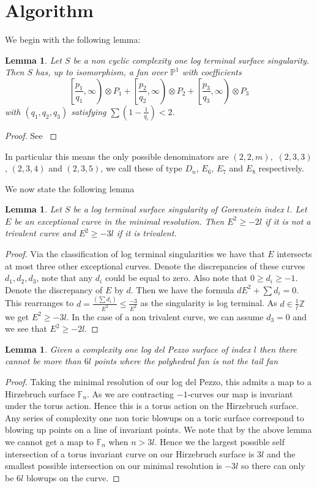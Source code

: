 \documentclass[12pt,a4paper]{book}      %
\newtheorem{lem}[thm]{Lemma}
\theoremstyle{definition}
\begin{document}
\section{Algorithm}
We begin with the following lemma:
\begin{lem}{\cite{Suss}}
Let $S$ be a non cyclic complexity one log terminal surface singularity. Then $S$ has, up to isomorphism, a fan over $\mathbb{P}^1$ with coefficients
\[
\left[\frac{p_1}{q_1}, \infty \right) \otimes P_1 + \left[ \frac{p_2}{q_2}, \infty \right) \otimes P_2 + \left[ \frac{p_3}{q_3}, \infty \right) \otimes P_3
\]
with $(q_1, q_2, q_3)$ satisfying $\sum(1 - \frac{1}{q_i}) < 2$.
\end{lem}
\begin{proof}
See \cite{Suss}
\end{proof}
In particular this means the only possible denominators are $(2,2,m),$ $(2,3,3)$, $(2,3,4)$ and $(2,3,5)$, we call these of type $D_n$, $E_6$, $E_7$ and $E_8$ respectively. 

We now state the following  lemma
\begin{lem}{\label{trivalent}}
Let $S$ be a log terminal surface singularity of Gorenstein index $l$. Let $E$ be an exceptional curve in the minimal resolution. Then $E^2 \geq -2l$ if it is not a trivalent curve and $E^2 \geq -3l$ if it is trivalent.
\end{lem}
\begin{proof}
Via the classification of log terminal singularities \cite{Br} we have that $E$ intersects at most three other exceptional curves. Denote the discrepancies of these curves $d_1, d_2, d_3$, note that any $d_i$ could be equal to zero. Also note that $0 \geq d_i \geq -1$. Denote the discrepancy of $E$ by $d$. Then we have the formula $dE^2 + \sum d_i = 0$.   This rearranges to $d = \frac{(\sum d_i)}{E^2} \leq \frac{-3}{E^2}$ as the singularity is log terminal. As $d \in \frac{1}{l} \mathbb{Z}$ we get $E^2 \geq -3l$. In the case of a non trivalent curve, we can assume $d_3 = 0$ and we see that $E^2 \geq -2l$.
\end{proof}



\begin{lem}
Given a complexity one log del Pezzo surface of index $l$ then there cannot be more than $6l$ points where the polyhedral fan is not the tail fan
\end{lem}
\begin{proof}
Taking the minimal resolution of our log del Pezzo, this admits a map to a Hirzebruch surface $\mathbb{F}_n$. As we are contracting $-1$-curves our map is invariant under the torus action. Hence this is a torus action on the Hirzebruch surface. Any series of complexity one non toric blowups on a toric surface correspond to blowing up points on a line of invariant points. We note that by the above lemma we cannot get a map to $\mathbb{F}_n$ when $n > 3l$. Hence we the largest possible self intersection of a torus invariant curve on our Hirzebruch surface is $3l$ and the smallest possible intersection on our minimal resolution is $-3l$ so there can only be $6l$ blowups on the curve.
\end{proof}
\end{document}
